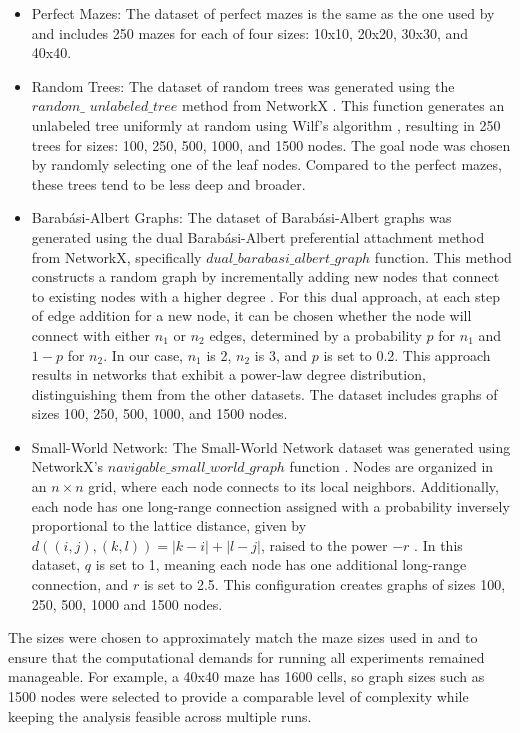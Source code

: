 \begin{itemize} 
    \item Perfect Mazes: The dataset of perfect mazes \cite{Naeem2021} is the same as the one used by  and includes 250 mazes for each of four sizes: 10x10, 20x20, 30x30, and 40x40.
    \item Random Trees: The dataset of random trees was generated using the $random\_$ $unlabeled\_tree$ method from NetworkX \cite{Hagberg2008}. This function generates an unlabeled tree uniformly at random using Wilf's algorithm \cite{Wilf1981}, resulting in 250 trees for sizes: 100, 250, 500, 1000, and 1500 nodes. The goal node was chosen by randomly selecting one of the leaf nodes. Compared to the perfect mazes, these trees tend to be less deep and broader.
    \item Barabási-Albert Graphs: The dataset of Barabási-Albert graphs was generated using the dual Barabási-Albert preferential attachment method \cite{Moshiri2018} from NetworkX, specifically $dual\_barabasi\_albert\_graph$ function. This method constructs a random graph by incrementally adding new nodes that connect to existing nodes with a higher degree \cite{Barabasi1999}. For this dual approach, at each step of edge addition for a new node, it can be chosen whether the node will connect with either $n_1$ or $n_2$ edges, determined by a probability $p$ for $n_1$ and $1-p$ for $n_2$. In our case, $n_1$ is 2, $n_2$ is 3, and $p$ is set to 0.2. This approach results in networks that exhibit a power-law degree distribution, distinguishing them from the other datasets. The dataset includes graphs of sizes 100, 250, 500, 1000, and 1500 nodes.
    \item Small-World Network: The Small-World Network dataset was generated using NetworkX's $navigable\_small\_world\_graph$ function \cite{Hagberg2008}. Nodes are organized in an $n \times n$ grid, where each node connects to its local neighbors. Additionally, each node has one long-range connection assigned with a probability inversely proportional to the lattice distance, given by $d((i,j),(k,l)) = |k-i| + |l-j|$, raised to the power $-r$ \cite{Kleinberg2000}. In this dataset, $q$ is set to 1, meaning each node has one additional long-range connection, and $r$ is set to 2.5. This configuration creates graphs of sizes 100, 250, 500, 1000 and 1500 nodes.
\end{itemize}

The sizes were chosen to approximately match the maze sizes used in  and to ensure that the computational demands for running all experiments remained manageable. For example, a 40x40 maze has 1600 cells, so graph sizes such as 1500 nodes were selected to provide a comparable level of complexity while keeping the analysis feasible across multiple runs.

